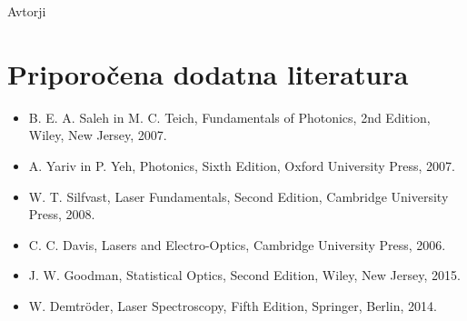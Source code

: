 \documentclass[11pt,fleqn]{book} %
\begin{document}
% 
\vspace{1em}

 Avtorji





\chapter*{Priporočena dodatna literatura}

\begin{itemize}
\setlength\itemsep{0.5em}
 \item B. E. A. Saleh in M. C. Teich, Fundamentals of Photonics, 2nd Edition, Wiley, New Jersey, 2007. 
 \item A. Yariv in P. Yeh, Photonics, Sixth Edition, Oxford University Press, 2007.
 \item W. T. Silfvast, Laser Fundamentals, Second Edition, Cambridge University Press, 2008. 
 \item C. C. Davis, Lasers and Electro-Optics, Cambridge University Press, 2006.
 \item J. W. Goodman, Statistical Optics, Second Edition, Wiley, New Jersey, 2015.
 \item W. Demtr\"oder, Laser Spectroscopy, Fifth Edition, Springer, Berlin, 2014.
\end{itemize}
\end{document}
